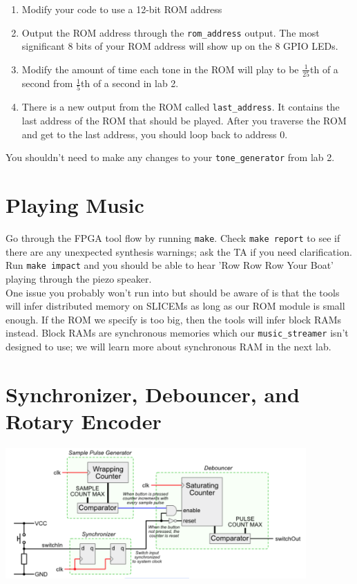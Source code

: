 \documentclass[11pt]{article}
\begin{document}
\begin{enumerate}
	\item Modify your code to use a 12-bit ROM address
	
	\item Output the ROM address through the \verb|rom_address| output. The most significant 8 bits of your ROM address will show up on the 8 GPIO LEDs.
	
	\item Modify the amount of time each tone in the ROM will play to be $\frac{1}{25}$th of a second from $\frac{1}{5}$th of a second in lab 2.
	
	\item There is a new output from the ROM called \verb|last_address|. It contains the last address of the ROM that should be played. After you traverse the ROM and get to the last address, you should loop back to address 0.
\end{enumerate}

You shouldn't need to make any changes to your \verb|tone_generator| from lab 2.

\section{Playing Music}
Go through the FPGA tool flow by running \verb|make|. Check \verb|make report| to see if there are any unexpected synthesis warnings; ask the TA if you need clarification. Run \verb|make impact| and you should be able to hear 'Row Row Row Your Boat' playing through the piezo speaker. \\

{\footnotesize * One issue you probably won't run into but should be aware of is that the tools will infer distributed memory on SLICEMs as long as our ROM module is small enough. If the ROM we specify is too big, then the tools will infer block RAMs instead. Block RAMs are synchronous memories which our \verb|music_streamer| isn't designed to use; we will learn more about synchronous RAM in the next lab.}

\section{Synchronizer, Debouncer, and Rotary Encoder}

\begin{center}
\includegraphics[height=5cm]{images/lab2_fig2.png}
\end{center}
\end{document}
